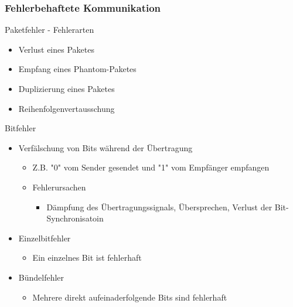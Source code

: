     \subsubsection{Fehlerbehaftete Kommunikation}
      Paketfehler - Fehlerarten
      \begin{itemize}
        \item Verlust eines Paketes
        \item Empfang eines Phantom-Paketes
        \item Duplizierung eines Paketes
        \item Reihenfolgenvertausschung
      \end{itemize}
      Bitfehler
      \begin{itemize}
        \item Verfälschung von Bits während der Übertragung
          \begin{itemize}
            \item Z.B. "0" vom Sender gesendet und "1" vom Empfänger empfangen
            \item Fehlerursachen
              \begin{itemize}
                \item Dämpfung des Übertragungssignals, Übersprechen, Verlust der Bit-Synchronisatoin
              \end{itemize}
          \end{itemize}
        \item Einzelbitfehler
          \begin{itemize}
            \item Ein einzelnes Bit ist fehlerhaft
          \end{itemize}
        \item Bündelfehler
          \begin{itemize}
            \item Mehrere direkt aufeinaderfolgende Bits sind fehlerhaft
          \end{itemize}
      \end{itemize}

